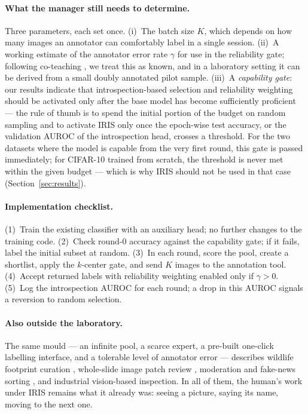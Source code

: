 \documentclass[a4paper,fleqn,longmktitle]{cas-sc}
\newcommand{\method}{IRIS}
\begin{document}
\paragraph{What the manager still needs to determine.} Three
parameters, each set once. (i)~The batch size $K$, which depends on how
many images an annotator can comfortably label in a single session.
(ii)~A working estimate of the annotator error rate $\gamma$ for use in
the reliability gate; following co-teaching \citep{han2018}, we treat
this as known, and in a laboratory setting it can be derived from a
small doubly annotated pilot sample. (iii)~A \emph{capability gate}:
our results indicate that introspection-based selection and reliability
weighting should be activated only after the base model has become
sufficiently proficient --- the rule of thumb is to spend the initial
portion of the budget on random sampling and to activate \method{} only
once the epoch-wise test accuracy, or the validation AUROC of the
introspection head, crosses a threshold. For the two datasets where the
model is capable from the very first round, this gate is passed
immediately; for CIFAR-10 trained from scratch, the threshold is never
met within the given budget --- which is why \method{} should not be
used in that case (Section~\ref{sec:results}).

\paragraph{Implementation checklist.} (1)~Train the existing classifier
with an auxiliary head; no further changes to the training code.
(2)~Check round-0 accuracy against the capability gate; if it fails,
label the initial subset at random. (3)~In each round, score the pool,
create a shortlist, apply the $k$-center gate, and send $K$ images to
the annotation tool. (4)~Accept returned labels with reliability
weighting enabled only if $\gamma > 0$. (5)~Log the introspection AUROC
for each round; a drop in this AUROC signals a reversion to random
selection.

\paragraph{Also outside the laboratory.} The same mould --- an infinite
pool, a scarce expert, a pre-built one-click labelling interface, and a
tolerable level of annotator error --- describes wildlife footprint
curation \citep{petso2026}, whole-slide image patch review
\citep{lou2026}, moderation and fake-news sorting \citep{comito2026},
and industrial vision-based inspection. In all of them, the human's
work under \method{} remains what it already was: seeing a picture,
saying its name, moving to the next one.
\end{document}
